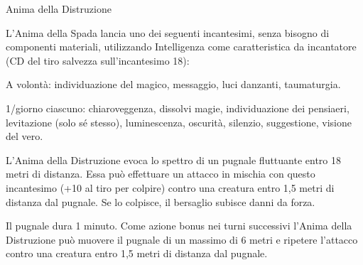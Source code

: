 \begin{DndMonster}[float*=b,width=\textwidth + 8pt]{Anima della Distruzione}
\begin{multicols}{2}
       L'Anima della Spada lancia uno dei seguenti incantesimi, senza bisogno di componenti materiali, utilizzando Intelligenza come caratteristica da incantatore (CD del tiro salvezza sull'incantesimo 18):
      \begin{DndMonsterSpells}
        \item \textsf{A volontà:} individuazione del magico, messaggio, luci danzanti, taumaturgia.
        \item \textsf{1/giorno ciascuno:} chiaroveggenza, dissolvi magie, individuazione dei pensiaeri, levitazione \textsf{(solo sé stesso)}, luminescenza, oscurità, silenzio, suggestione, visione del vero.
      \end{DndMonsterSpells}
  
       L'Anima della Distruzione evoca lo spettro di un pugnale fluttuante entro 18 metri di distanza. Essa può effettuare un attacco in mischia con questo incantesimo (+10 al tiro per colpire) contro una creatura entro 1,5 metri di distanza dal pugnale. Se lo colpisce, il bersaglio subisce  danni da forza. 

      Il pugnale dura 1 minuto. Come azione bonus nei turni successivi l'Anima della Distruzione può muovere il pugnale di un massimo di 6 metri e ripetere l'attacco contro una creatura entro 1,5 metri di distanza dal pugnale.
    \end{multicols}
  \end{DndMonster}